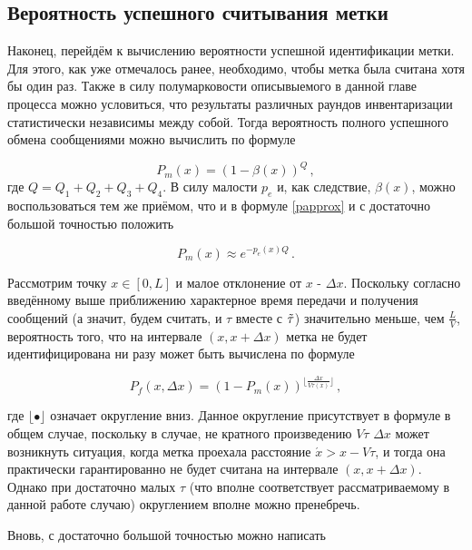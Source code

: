 \documentclass[12pt]{article}
\theoremstyle{definition}
\begin{document}
\subsection{Вероятность успешного считывания метки}
\label{sec:ch24}

Наконец, перейдём к вычислению вероятности успешной идентификации метки. Для этого, как уже отмечалось ранее, необходимо, чтобы метка была считана хотя бы один раз. Также в силу полумарковости описывыемого в данной главе процесса можно условиться, что результаты различных раундов инвентаризации статистически независимы между собой. Тогда вероятность полного успешного обмена сообщениями можно вычислить по формуле

\begin{equation}
    P_m(x)=(1-\beta(x))^Q\,,
\end{equation}
где $Q=Q_1+Q_2+Q_3+Q_4$. В силу малости $p_e$ и, как следствие, $\beta(x)$, можно воспользоваться тем же приёмом, что и в формуле \eqref{papprox} и с достаточно большой точностью положить

\begin{equation}
\label{P_m}
    P_m(x)\approx e^{-p_e(x)Q}\,.
\end{equation}

Рассмотрим точку $x\in[0,L]$ и малое отклонение от $x$ - $\Delta x$. Поскольку согласно введённому выше приближению характерное время передачи и получения сообщений (а значит, будем считать, и $\tau$ вместе с $\Tilde{\tau}$) значительно меньше, чем $\frac{L}{V}$, вероятность того, что на интервале $(x,x+\Delta x)$ метка не будет идентифицирована ни разу может быть вычислена по формуле

\begin{equation}
    P_f(x,\Delta x) = (1-P_m(x))^{\lfloor \frac{\Delta x}{V\tau(x)}\rfloor}\,,
\end{equation}

где $\lfloor\bullet\rfloor$ означает округление вниз. Данное округление присутствует в формуле в общем случае, поскольку в случае, не кратного произведению $V\tau$ $\Delta x$ может возникнуть ситуация, когда метка проехала расстояние $\acute{x}>x-V\tau$, и тогда она практически гарантированно не будет считана на интервале $(x,x+\Delta x)$. Однако при достаточно малых $\tau$ (что вполне соответствует рассматриваемому в данной работе случаю) округлением вполне можно пренебречь.


Вновь, с достаточно большой точностью можно написать
\end{document}
